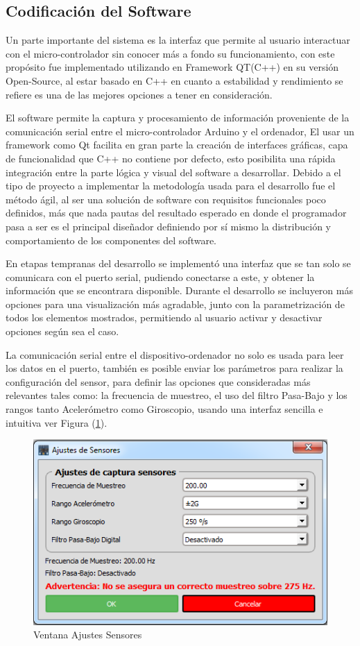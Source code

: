 \documentclass[12pt,a4paper]{article}
\begin{document}
\subsection{Codificación del Software}
Un parte importante del sistema es la interfaz que permite al usuario interactuar con el micro-controlador sin conocer más a fondo su funcionamiento,
con este propósito fue implementado utilizando en Framework QT(C++)\cite{QT} en su versión Open-Source, al estar basado en C++ en cuanto a estabilidad y rendimiento se refiere es una de las mejores opciones a tener en consideración.

El software permite la captura y procesamiento de información proveniente de la comunicación serial entre el micro-controlador Arduino y el ordenador,
El usar un framework como Qt facilita en gran parte la creación de interfaces gráficas, capa de funcionalidad que C++ no contiene por defecto, esto posibilita una rápida integración entre la parte lógica y visual del software a desarrollar.
Debido a el tipo de proyecto a implementar la metodología usada para el desarrollo fue el método ágil, al ser una solución de software con requisitos funcionales poco definidos, más que nada pautas del resultado esperado en donde el programador pasa a ser es el principal diseñador definiendo por sí mismo la distribución y comportamiento de los componentes del software.

En etapas tempranas del desarrollo se implementó una interfaz que se tan solo se comunicara con el puerto serial, pudiendo conectarse a este, y obtener la información que se encontrara disponible.
Durante el desarrollo se incluyeron más opciones para una visualización más agradable, junto con la parametrización de todos los elementos mostrados, permitiendo al usuario activar y desactivar opciones según sea el caso.

La comunicación serial entre el dispositivo-ordenador no solo es usada para leer los datos en el puerto, también es posible enviar los parámetros para realizar la configuración del sensor, para definir las opciones que consideradas más relevantes tales como: la frecuencia de muestreo, el uso del filtro Pasa-Bajo y los rangos tanto Acelerómetro como Giroscopio, usando una interfaz sencilla e intuitiva ver Figura (\ref{fig:ajustessensores}).

\begin{figure}[H]
	\centering
	\includegraphics[scale=0.6]{images/ajustesSensores}
	\caption{Ventana Ajustes Sensores}
	\label{fig:ajustessensores}
\end{figure}
\end{document}
